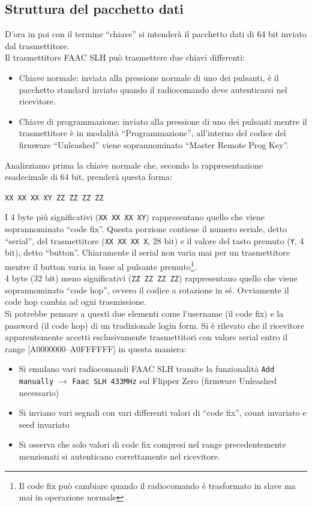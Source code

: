 \subsection{Struttura del pacchetto dati}
\label{sub:payload}
D’ora in poi con il termine “chiave” si intenderà il pacchetto dati di 64 bit inviato dal trasmettitore.\\
Il trasmettitore FAAC SLH può trasmettere due chiavi differenti:
\begin{itemize}
  \item Chiave normale: inviata alla pressione normale di uno dei pulsanti, è il pacchetto standard inviato quando il radiocomando deve autenticarsi nel ricevitore.
  \item Chiave di programmazione: inviato alla pressione di uno dei pulsanti mentre il trasmettitore è in modalità “Programmazione”, all’interno del codice del firmware “Unleashed” viene soprannominato “Master Remote Prog Key”.
\end{itemize}
Analizziamo prima la chiave normale che, secondo la rappresentazione esadecimale di 64 bit, prenderà questa forma:
\begin{center}
  \texttt{XX XX XX XY ZZ ZZ ZZ ZZ}
\end{center}
I 4 byte più significativi (\texttt{XX XX XX XY}) rappresentano quello che viene soprannominato “code fix”. Questa porzione contiene il numero seriale, detto “serial”, del trasmettitore (\texttt{XX XX XX X}, 28 bit) e il valore del tasto premuto (\texttt{Y}, 4 bit), detto “button”. Chiaramente il serial non varia mai per un trasmettitore mentre il button varia in base al pulsante premuto\footnote{Il code fix può cambiare quando il radiocomando è trasformato in slave ma mai in operazione normale}.\\
4 byte (32 bit) meno significativi (\texttt{ZZ ZZ ZZ ZZ}) rappresentano quello che viene soprannominato “code hop”, ovvero il codice a rotazione in sé. Ovviamente il code hop cambia ad ogni trasmissione.\\
Si potrebbe pensare a questi due elementi come l’username (il code fix) e la password (il code hop) di un tradizionale login form.
Si è rilevato che il ricevitore apparentemente accetti esclusivamente trasmettitori con valore serial entro il range [A0000000--A0FFFFFF] in questa maniera:\\
\begin{itemize}
  \item Si emulano vari radiocomandi FAAC SLH tramite la funzionalità \texttt{Add manually} \(\rightarrow\) \texttt{Faac SLH 433MHz} sul Flipper Zero (firmware Unleashed necessario)
  \item Si inviano vari segnali con vari differenti valori di “code fix”, count invariato e seed invariato
  \item Si osserva che solo valori di code fix compresi nel range precedentemente menzionati si autenticano correttamente nel ricevitore.
\end{itemize}
